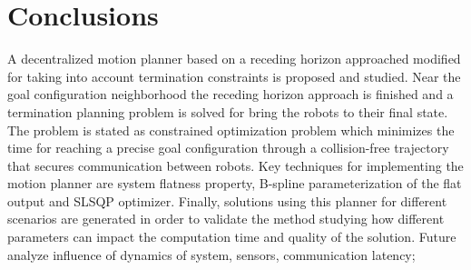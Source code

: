 \documentclass[eprint]{actapoly}
\begin{document}
%

\section{Conclusions}

A decentralized motion planner based on a receding horizon approached modified for taking into account 
termination constraints is proposed and studied. Near the goal configuration 
neighborhood the receding horizon approach is finished and a termination planning 
problem is solved for bring the robots to their final state.
The problem is stated as constrained optimization problem which minimizes the time 
for reaching a precise goal configuration through a collision-free trajectory that 
secures communication between robots.
Key techniques for implementing the motion planner are system flatness property, 
B-spline parameterization of the flat output and SLSQP optimizer.
Finally, solutions using this planner for different scenarios are generated in 
order to validate the method studying how different parameters can impact the 
computation time and quality of the solution. 
Future analyze influence of dynamics of system, sensors, communication latency;




%




\end{document}
